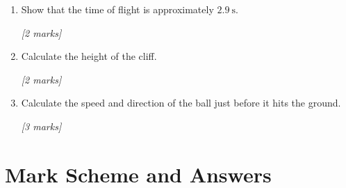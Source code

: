 \begin{tcolorbox}[colback=white, colframe=midblue, breakable]
\begin{enumerate}[label=(\alph*)]
  \item \begin{minipage}[t]{\linewidth}
  Show that the time of flight is approximately $2.9\ \text{s}$.
  \par\hfill\textit{[2 marks]}
  \vspace{3.5cm}
  \end{minipage}

  \item \begin{minipage}[t]{\linewidth}
  Calculate the height of the cliff.
  \par\hfill\textit{[2 marks]}
  \vspace{3cm}
  \end{minipage}

  \item \begin{minipage}[t]{\linewidth}
  Calculate the speed and direction of the ball just before it hits the ground.
  \par\hfill\textit{[3 marks]}
  \vspace{4cm}
  \end{minipage}
\end{enumerate}

\end{tcolorbox}

\section{Mark Scheme and Answers}

